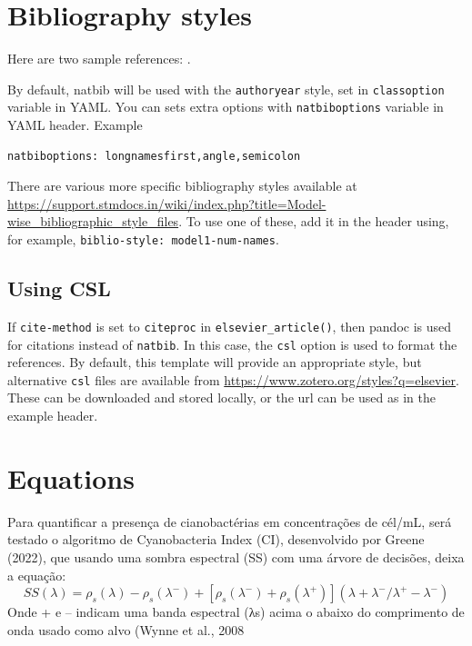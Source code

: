 \documentclass[
  super,
  preprint,
  3p]{elsarticle}
\begin{document}
\hypertarget{bibliography-styles}{%
\section{Bibliography styles}\label{bibliography-styles}}

Here are two sample references: \citet{Feynman1963118} \citet{qin}.

By default, natbib will be used with the \texttt{authoryear} style, set
in \texttt{classoption} variable in YAML. You can sets extra options
with \texttt{natbiboptions} variable in YAML header. Example

\begin{verbatim}
natbiboptions: longnamesfirst,angle,semicolon
\end{verbatim}

There are various more specific bibliography styles available at
\url{https://support.stmdocs.in/wiki/index.php?title=Model-wise_bibliographic_style_files}.
To use one of these, add it in the header using, for example,
\texttt{biblio-style:\ model1-num-names}.

\hypertarget{using-csl}{%
\subsection{Using CSL}\label{using-csl}}

If \texttt{cite-method} is set to \texttt{citeproc} in
\texttt{elsevier\_article()}, then pandoc is used for citations instead
of \texttt{natbib}. In this case, the \texttt{csl} option is used to
format the references. By default, this template will provide an
appropriate style, but alternative \texttt{csl} files are available from
\url{https://www.zotero.org/styles?q=elsevier}. These can be downloaded
and stored locally, or the url can be used as in the example header.

\hypertarget{equations}{%
\section{Equations}\label{equations}}

Para quantificar a presença de cianobactérias em concentrações de
cél/mL, será testado o algoritmo de Cyanobacteria Index (CI),
desenvolvido por Greene (2022), que usando uma sombra espectral (SS) com
uma árvore de decisões, deixa a equação: \[
SS(λ)= ρ_s (λ)-ρ_s (λ^- )+[ρ_s (λ^- )+ ρ_s (λ^+ )]  (λ+λ^-/λ^+ -λ^- )  
\] Onde + e -- indicam uma banda espectral (λs) acima o abaixo do
comprimento de onda usado como alvo (Wynne et al., 2008
\end{document}
